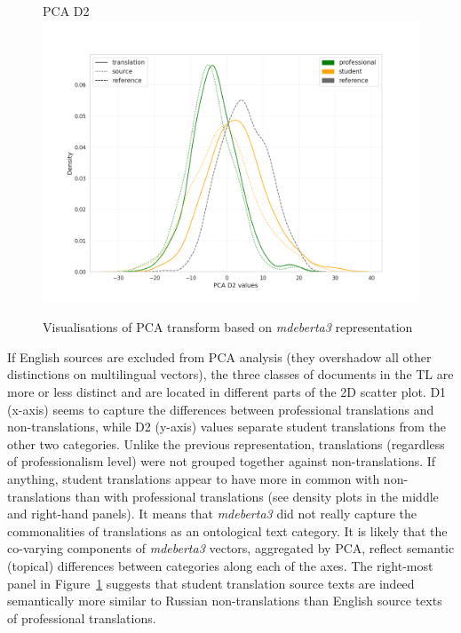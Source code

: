 \begin{figure}[H]
	\begin{minipage}[c]{0.31\linewidth}
		\centering
		PCA D2
		\includegraphics[width=\linewidth]{figures/pca/src-var-ttype-mdeberta3-base-PCA-D2-lines}
	\end{minipage}
	\caption{\label{fig:vars-deberta}Visualisations of PCA transform based on \textit{mdeberta3} representation}	
\end{figure}

If English sources are excluded from PCA analysis (they overshadow all other distinctions on multilingual vectors), the three classes of documents in the TL are more or less distinct and are located in different parts of the 2D scatter plot. D1 (x-axis) seems to capture the differences between professional translations and non-translations, while D2 (y-axis) values separate student translations from the other two categories. Unlike the previous representation, translations (regardless of professionalism level) were not grouped together against non-translations. If anything, student translations appear to have more in common with non-translations than with professional translations (see density plots in the middle and right-hand panels). It means that \textit{mdeberta3} did not really capture the commonalities of translations as an ontological text category. It is likely that the co-varying components of \textit{mdeberta3} vectors, aggregated by PCA, reflect semantic (topical) differences between categories along each of the axes. The right-most panel in Figure~\ref{fig:vars-deberta} suggests that student translation source texts are indeed semantically more similar to Russian non-translations than English source texts of professional translations. 

